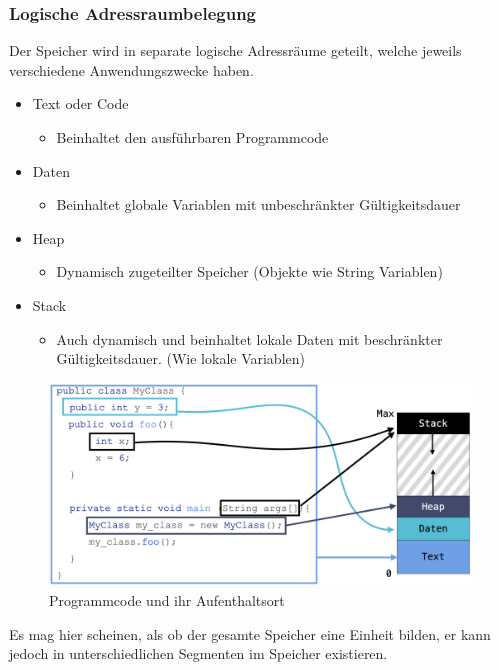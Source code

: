 \documentclass{article}
\begin{document}
	\subsubsection{Logische Adressraumbelegung}
	Der Speicher wird in separate logische Adressräume geteilt, welche jeweils verschiedene Anwendungszwecke haben.
	\begin{itemize}
		\item{Text oder Code}
		\begin{itemize}
			\item{Beinhaltet den ausführbaren Programmcode}
		\end{itemize}
		\item{Daten}
		\begin{itemize}
			\item{Beinhaltet globale Variablen mit unbeschränkter Gültigkeitsdauer}
		\end{itemize}
		\item{Heap}
		\begin{itemize}
			\item{Dynamisch zugeteilter Speicher (Objekte wie String Variablen)}
		\end{itemize}
		\item{Stack}
		\begin{itemize}
			\item{Auch dynamisch und beinhaltet lokale Daten mit beschränkter Gültigkeitsdauer. (Wie lokale Variablen)}
		\end{itemize}
	\end{itemize}
	\begin{figure}[H]
	\centering
	\includegraphics[scale=0.3]{Bilder/virtual.png}
	\caption{Programmcode und ihr Aufenthaltsort}
	\end{figure}
	Es mag hier scheinen, als ob der gesamte Speicher eine Einheit bilden, er kann jedoch in unterschiedlichen Segmenten im Speicher existieren.
\end{document}
